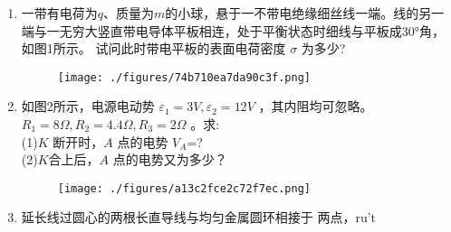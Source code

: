 
\begin{enumerate}
\item 一带有电荷为$q$、质量为$m$的小球，悬于一不带电绝缘细丝线一端。线的另一端与一无穷大竖直带电导体平板相连，处于平衡状态时细线与平板成$30$°角，如图1所示。 试问此时带电平板的表面电荷密度 $\sigma$ 为多少?
\begin{figure}[ht]
\centering
\texttt{[image: ./figures/74b710ea7da90c3f.png]}
\caption{} \label{fig_ZKYP06_1}
\end{figure}
\item 如图2所示，电源电动势  $\varepsilon_1=3V,\varepsilon_2=12V$ ，其内阻均可忽略。 $R_1=8\Omega,R_2=4.4\Omega,R_3=2\Omega$  。求:\\
(1)$K$ 断开时，$A$  点的电势  $V_A$=?\\
(2)$K$合上后，$A$  点的电势又为多少？
\begin{figure}[ht]
\centering
\texttt{[image: ./figures/a13c2fce2c72f7ec.png]}
\caption{} \label{fig_ZKYP06_2}
\end{figure}
\item 延长线过圆心的两根长直导线与均匀金属圆环相接于  两点，ru't
\end{enumerate}